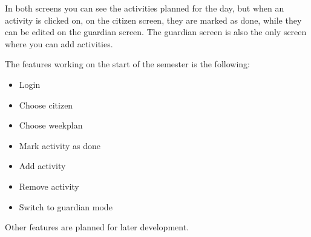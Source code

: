 In both screens you can see the activities planned for the day, but when an activity is clicked on, on the citizen screen, they are marked as done, while they can be edited on the guardian screen. The guardian screen is also the only screen where you can add activities.

The features working on the start of the semester is the following:
\begin{itemize}
    \item Login 
    \item Choose citizen 
    \item Choose weekplan
    \item Mark activity as done 
    \item Add activity
    \item Remove activity
    \item Switch to guardian mode
\end{itemize}

Other features are planned for later development.
